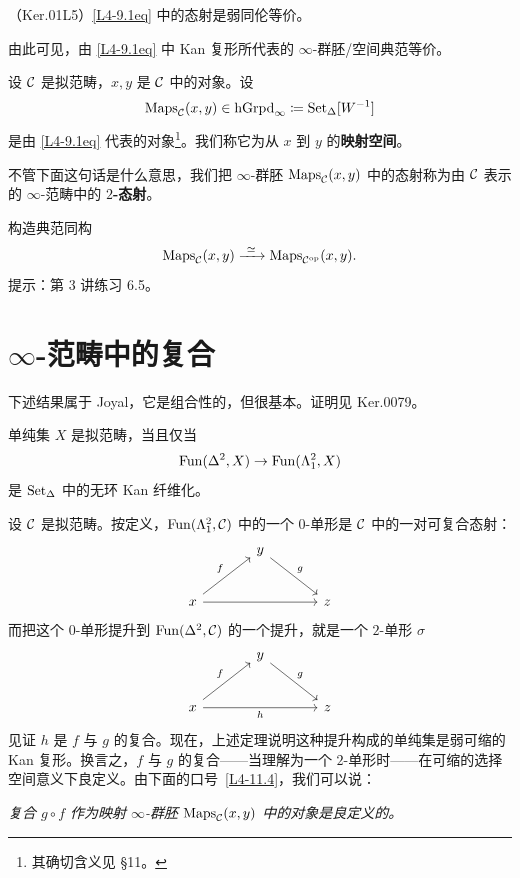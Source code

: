 \begin{proposition}\label{L4-9.2}
（Ker.01L5）\eqref{L4-9.1eq} 中的态射是弱同伦等价。
\end{proposition}

\nitem\label{L4-9.3} 由此可见，由 \eqref{L4-9.1eq} 中 Kan 复形所代表的 $\infty$-群胚/空间典范等价。

\begin{definition}\label{L4-9.4}
设 $\mathcal{C}$ 是拟范畴，$x,y$ 是 $\mathcal{C}$ 中的对象。设
\[
\mathrm{Maps}_{\mathcal{C}}(x,y)\in\operatorname{hGrpd}_\infty\coloneqq\operatorname{Set}_\Delta[W^{-1}]
\]
是由 \eqref{L4-9.1eq} 代表的对象\footnote{其确切含义见 \S11。}。我们称它为从 $x$ 到 $y$ 的\textbf{映射空间}。
\end{definition}


\nitem\label{L4-9.5} 不管下面这句话是什么意思，我们把 $\infty$-群胚 $\mathrm{Maps}_{\mathcal{C}}(x,y)$ 中的态射称为由 $\mathcal{C}$ 表示的 $\infty$-范畴中的 \textbf{$2$-态射}。

\begin{exercise}\label{L4-9.6}
构造典范同构
\[
\mathrm{Maps}_{\cC}(x,y)\xrightarrow{\ \simeq\ }\mathrm{Maps}_{\cC^{\op}}(x,y).
\]
提示：第 3 讲练习 6.5。
\end{exercise}

\section{$\infty$-范畴中的复合}

\nitem\label{L4-10.1} 下述结果属于 Joyal，它是组合性的，但很基本。证明见 Ker.0079。

\begin{theorem}\label{L4-10.2}
单纯集 $X$ 是拟范畴，当且仅当
\[
\operatorname{Fun}(\Delta^2,X)\to\operatorname{Fun}(\Lambda^2_1,X)
\]
是 $\operatorname{Set}_\Delta$ 中的无环 Kan 纤维化。
\end{theorem}

\nitem\label{L4-10.3} 设 $\mathcal{C}$ 是拟范畴。按定义，$\operatorname{Fun}(\Lambda^2_1,\mathcal{C})$ 中的一个 $0$-单形是 $\mathcal{C}$ 中的一对可复合态射：
\[
\begin{tikzcd}[column sep=3.4em,row sep=2.4em]
& y \arrow[dr, "g"] & \\
x \arrow[ur, "f"] \arrow[rr] & & z
\end{tikzcd}
\]
而把这个 $0$-单形提升到 $\operatorname{Fun}(\Delta^2,\mathcal{C})$ 的一个提升，就是一个 $2$-单形 $\sigma$
\begin{equation}\label{L4-10.1eq}
\begin{tikzcd}[column sep=3.4em,row sep=2.4em]
& y \arrow[dr, "g"] & \\
x \arrow[ur, "f"] \arrow[rr, "h"'] & & z
\end{tikzcd}
\end{equation}
见证 $h$ 是 $f$ 与 $g$ 的复合。现在，上述定理说明这种提升构成的单纯集是弱可缩的 Kan 复形。换言之，$f$ 与 $g$ 的复合——当理解为一个 $2$-单形时——在可缩的选择空间意义下良定义。由下面的口号~\ref{L4-11.4}，我们可以说：
\begin{center}
\emph{复合 $g\circ f$ 作为映射 $\infty$-群胚 $\mathrm{Maps}_{\mathcal{C}}(x,y)$ 中的对象是良定义的。}
\end{center}

